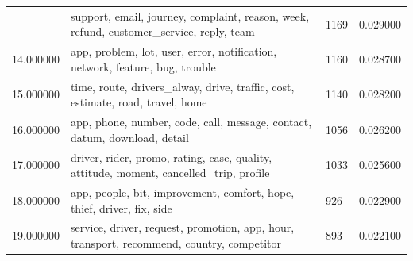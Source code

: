 \documentclass[12pt]{article}
\begin{document}
\begin{tabular}{|p{2cm}|p{8cm}|p{1cm}|p{2cm}|}
\hline
\centering
13.000000                                                                 & support, email, journey, complaint, reason, week, refund, customer\_service, reply, team                                     & 1169                    & 0.029000                  \\
14.000000                                                                 & app, problem, lot, user, error, notification, network, feature, bug, trouble                                                 & 1160                    & 0.028700                  \\
15.000000                                                                 & time, route, drivers\_alway, drive, traffic, cost, estimate, road, travel, home                                              & 1140                    & 0.028200                  \\
16.000000                                                                 & app, phone, number, code, call, message, contact, datum, download, detail                                                    & 1056                    & 0.026200                  \\
17.000000                                                                 & driver, rider, promo, rating, case, quality, attitude, moment, cancelled\_trip, profile                                      & 1033                    & 0.025600                  \\
18.000000                                                                 & app, people, bit, improvement, comfort, hope, thief, driver, fix, side                                                       & 926                     & 0.022900                  \\
19.000000                                                                 & service, driver, request, promotion, app, hour, transport, recommend, country, competitor                                    & 893                     & 0.022100   \\ 
\hline              
\end{tabular}
\end{document}
